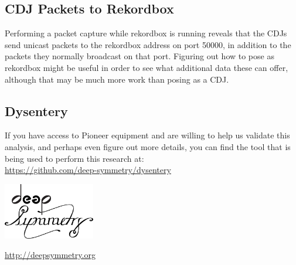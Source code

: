 \documentclass[11pt]{article}
\begin{document}
\subsection{CDJ Packets to Rekordbox}

Performing a packet capture while rekordbox is running reveals that
the CDJs send unicast packets to the rekordbox address on port 50000,
in addition to the packets they normally broadcast on that port.
Figuring out how to pose as rekordbox might be useful in order to see
what additional data these can offer, although that may be much more
work than posing as a CDJ.

\subsection{Dysentery}

If you have access to Pioneer equipment and are willing to help us
validate this analysis, and perhaps even figure out more details, you
can find the tool that is being used to perform this research at: \\
\url{https://github.com/deep-symmetry/dysentery}

\begin{appendix}

  \listoffigures

  \listoftables

  \begin{center}
    \begin{samepage}
      \includegraphics[width=4cm]{assets/DS-Logo-bw-4k}

      \vspace{0.25cm}
      \url{http://deepsymmetry.org}
    \end{samepage}
  \end{center}

\end{appendix}
\end{document}
